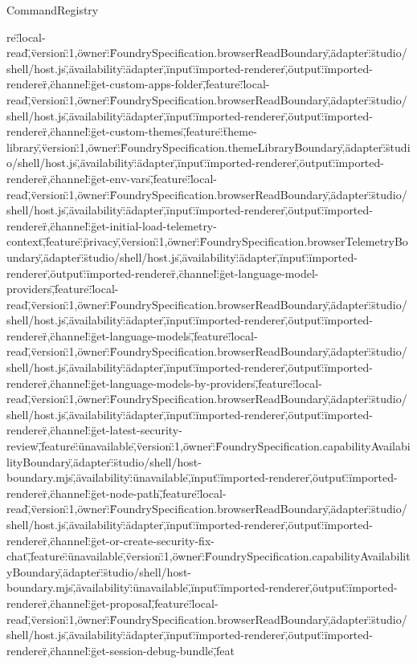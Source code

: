 \begin{lexlean}{CommandRegistry}
\begin{semanticmodule}
{re\":\"local-read\",\"version\":1,\"owner\":\"FoundrySpecification.browserReadBoundary\",\"adapter\":\"studio/shell/host.js\",\"availability\":\"adapter\",\"input\":\"imported-renderer\",\"output\":\"imported-renderer\"},{\"channel\":\"get-custom-apps-folder\",\"feature\":\"local-read\",\"version\":1,\"owner\":\"FoundrySpecification.browserReadBoundary\",\"adapter\":\"studio/shell/host.js\",\"availability\":\"adapter\",\"input\":\"imported-renderer\",\"output\":\"imported-renderer\"},{\"channel\":\"get-custom-themes\",\"feature\":\"theme-library\",\"version\":1,\"owner\":\"FoundrySpecification.themeLibraryBoundary\",\"adapter\":\"studio/shell/host.js\",\"availability\":\"adapter\",\"input\":\"imported-renderer\",\"output\":\"imported-renderer\"},{\"channel\":\"get-env-vars\",\"feature\":\"local-read\",\"version\":1,\"owner\":\"FoundrySpecification.browserReadBoundary\",\"adapter\":\"studio/shell/host.js\",\"availability\":\"adapter\",\"input\":\"imported-renderer\",\"output\":\"imported-renderer\"},{\"channel\":\"get-initial-load-telemetry-context\",\"feature\":\"privacy\",\"version\":1,\"owner\":\"FoundrySpecification.browserTelemetryBoundary\",\"adapter\":\"studio/shell/host.js\",\"availability\":\"adapter\",\"input\":\"imported-renderer\",\"output\":\"imported-renderer\"},{\"channel\":\"get-language-model-providers\",\"feature\":\"local-read\",\"version\":1,\"owner\":\"FoundrySpecification.browserReadBoundary\",\"adapter\":\"studio/shell/host.js\",\"availability\":\"adapter\",\"input\":\"imported-renderer\",\"output\":\"imported-renderer\"},{\"channel\":\"get-language-models\",\"feature\":\"local-read\",\"version\":1,\"owner\":\"FoundrySpecification.browserReadBoundary\",\"adapter\":\"studio/shell/host.js\",\"availability\":\"adapter\",\"input\":\"imported-renderer\",\"output\":\"imported-renderer\"},{\"channel\":\"get-language-models-by-providers\",\"feature\":\"local-read\",\"version\":1,\"owner\":\"FoundrySpecification.browserReadBoundary\",\"adapter\":\"studio/shell/host.js\",\"availability\":\"adapter\",\"input\":\"imported-renderer\",\"output\":\"imported-renderer\"},{\"channel\":\"get-latest-security-review\",\"feature\":\"unavailable\",\"version\":1,\"owner\":\"FoundrySpecification.capabilityAvailabilityBoundary\",\"adapter\":\"studio/shell/host-boundary.mjs\",\"availability\":\"unavailable\",\"input\":\"imported-renderer\",\"output\":\"imported-renderer\"},{\"channel\":\"get-node-path\",\"feature\":\"local-read\",\"version\":1,\"owner\":\"FoundrySpecification.browserReadBoundary\",\"adapter\":\"studio/shell/host.js\",\"availability\":\"adapter\",\"input\":\"imported-renderer\",\"output\":\"imported-renderer\"},{\"channel\":\"get-or-create-security-fix-chat\",\"feature\":\"unavailable\",\"version\":1,\"owner\":\"FoundrySpecification.capabilityAvailabilityBoundary\",\"adapter\":\"studio/shell/host-boundary.mjs\",\"availability\":\"unavailable\",\"input\":\"imported-renderer\",\"output\":\"imported-renderer\"},{\"channel\":\"get-proposal\",\"feature\":\"local-read\",\"version\":1,\"owner\":\"FoundrySpecification.browserReadBoundary\",\"adapter\":\"studio/shell/host.js\",\"availability\":\"adapter\",\"input\":\"imported-renderer\",\"output\":\"imported-renderer\"},{\"channel\":\"get-session-debug-bundle\",\"feat}
\end{semanticmodule}
\end{lexlean}
